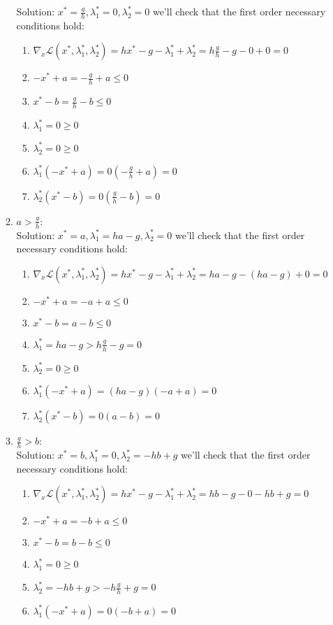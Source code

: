 \documentclass{article}
\begin{document}
\begin{enumerate}[(a)]
\begin{enumerate}
Solution: $x^* =  \frac{g}{h}, \lambda_1^* = 0, \lambda_2^* = 0$
we'll check that the first order necessary conditions hold:
\begin{enumerate}[(1)] 
\item $\nabla_x\mathcal{L}(x^*, \lambda_1^*, \lambda_2^*) = hx^*-g -\lambda_1^*+\lambda_2^*  = h\frac{g}{h}-g -0+0 = 0$
\item $-x^*+a  = -\frac{g}{h}+a \le 0$
\item $x^*-b  = \frac{g}{h}-b\le 0$
\item $\lambda_1^*  = 0\ge 0$
\item $\lambda_2^*  = 0\ge 0$
\item $\lambda_1^*(-x^*+a) =0(-\frac{g}{h}+a) = 0$
\item $\lambda_2^*(x^*-b) = 0(\frac{g}{h}-b) = 0$
\end{enumerate}
\item $a > \frac{g}{h} $:\\
Solution: $x^* =  a, \lambda_1^* = ha-g, \lambda_2^* = 0$
we'll check that the first order necessary conditions hold:
\begin{enumerate}[(1)] 
\item $\nabla_x\mathcal{L}(x^*, \lambda_1^*, \lambda_2^*) = hx^*-g -\lambda_1^*+\lambda_2^*  = ha-g -(ha-g)+0 = 0$
\item $-x^*+a  = -a+a \le 0$
\item $x^*-b  = a-b\le 0$
\item $\lambda_1^*  = ha-g>h\frac{g}{h}-g = 0$
\item $\lambda_2^*  = 0\ge 0$
\item $\lambda_1^*(-x^*+a) =(ha-g)(-a+a) = 0$
\item $\lambda_2^*(x^*-b) = 0(a-b) = 0$
\end{enumerate}
\item $\frac{g}{h} > b$:\\
Solution: $x^* =  b, \lambda_1^* = 0, \lambda_2^* =-hb+g$
we'll check that the first order necessary conditions hold:
\begin{enumerate}[(1)] 
\item $\nabla_x\mathcal{L}(x^*, \lambda_1^*, \lambda_2^*) = hx^*-g -\lambda_1^*+\lambda_2^*  = hb-g -0-hb+g= 0$
\item $-x^*+a  = -b+a \le 0$
\item $x^*-b  = b-b\le 0$
\item $\lambda_1^*  = 0\ge  0$
\item $\lambda_2^*  = -hb+g > -h\frac{g}{h}+g = 0$
\item $\lambda_1^*(-x^*+a) =0(-b+a) = 0$

\end{enumerate}
\end{enumerate}
\end{enumerate}
\end{document}
